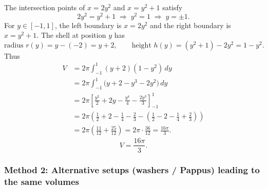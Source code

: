 \documentclass[12pt]{article}
\begin{document}
\begin{enumerate}[label=(\alph*)]
The intersection points of \(x=2y^{2}\) and \(x=y^{2}+1\) satisfy
\[
2y^{2}=y^{2}+1
\;\Rightarrow\;
y^{2}=1
\;\Rightarrow\;
y=\pm 1.
\]
For \(y\in[-1,1]\), the left boundary is \(x=2y^{2}\) and the right boundary is \(x=y^{2}+1\). The shell at position \(y\) has
\[
\text{radius } r(y)=y-(-2)=y+2,\qquad
\text{height } h(y)=(y^{2}+1)-2y^{2}=1-y^{2}.
\]
Thus
\begin{align*}
V
&=2\pi\int_{-1}^{1}(y+2)(1-y^{2})\,dy\\
&=2\pi\int_{-1}^{1}\big(y+2-y^{3}-2y^{2}\big)\,dy\\
&=2\pi\left[\frac{y^{2}}{2}+2y-\frac{y^{4}}{4}-\frac{2y^{3}}{3}\right]_{-1}^{1}\\
&=2\pi\left(\frac{1}{2}+2-\frac{1}{4}-\frac{2}{3}
-\left(\frac{1}{2}-2-\frac{1}{4}+\frac{2}{3}\right)\right)\\
&=2\pi\left(\frac{11}{12}+\frac{25}{12}\right)
=2\pi\cdot\frac{36}{12}
=\frac{16\pi}{3}.
\end{align*}
\[
\boxed{V=\dfrac{16\pi}{3}.}
\]
\end{enumerate}

\subsubsection*{Method 2: Alternative setups (washers / Pappus) leading to the same volumes}
\end{document}
